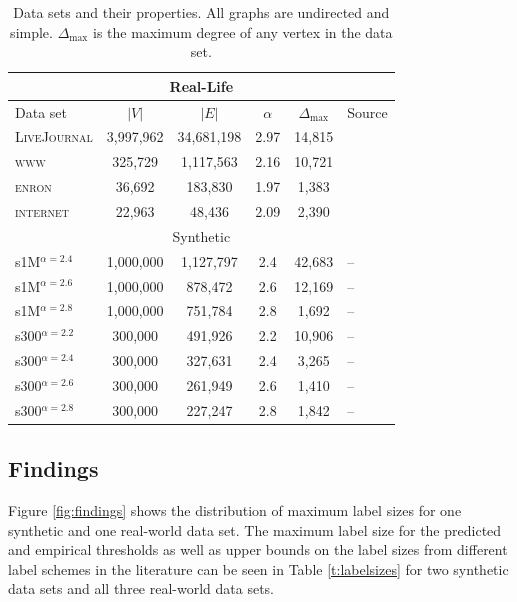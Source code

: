 \begin{table}[!ht]
\centering
\small
\begin{tabular}{lccccl}\hline
\multicolumn{6}{c}{Real-Life}\\\hline
Data set  & $\vert V \vert$ & $\vert E\vert$ & $\alpha$  & $\Delta_{\max}$ & Source\\\hline
\textsc{LiveJournal} &  3,997,962        &    34,681,198      & 2.97     & 14,815        & \cite{?}\\
\textsc{www}      & 325,729        & 1,117,563     & 2.16 & 10,721            & \cite{albert1999internet}\\
\textsc{enron}    &  36,692        &   183,830      & 1.97    &1,383         & \cite{leskovec2009community}\\
\textsc{internet} &  22,963        &    48,436      & 2.09     & 2,390        & \cite{newman}\\\hline


\multicolumn{6}{c}{Synthetic}\\\hline
s1M$^{\alpha=2.4}$    & 1,000,000       & 1,127,797      & 2.4    & 42,683 &-- \\
s1M$^{\alpha=2.6}$    & 1,000,000       & 878,472        & 2.6    & 12,169 &-- \\
s1M$^{\alpha=2.8}$    & 1,000,000       & 751,784         & 2.8   & 1,692  &-- \\
s300$^{\alpha=2.2}$    & 300,000        & 491,926        & 2.2    & 10,906 & --\\
s300$^{\alpha=2.4}$    & 300,000        & 327,631        & 2.4    & 3,265 & --\\
s300$^{\alpha=2.6}$    & 300,000        & 261,949        & 2.6    & 1,410 & --\\
s300$^{\alpha=2.8}$    & 300,000        & 227,247        & 2.8    & 1,842 & --\\\hline
\end{tabular}
\caption{Data sets and their properties. All graphs are undirected and simple. $\Delta_{\max}$ is the maximum degree of any vertex in the data set.}
\label{t:datasets}
\end{table}


\subsection{Findings}
Figure \ref{fig:findings} shows the distribution of maximum label sizes for one synthetic and one real-world data set. The maximum label size
for the predicted and empirical thresholds as well as upper bounds on the label sizes from different label schemes in the literature can be seen in Table \ref{t:labelsizes} for two synthetic
data sets and all three real-world data sets. 



